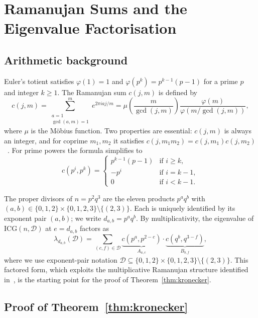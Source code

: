 \documentclass[12pt,a4paper]{article}
\theoremstyle{plain}
\theoremstyle{definition}
\newcommand{\ICG}{\mathrm{ICG}}
\newcommand{\vp}{\varphi}
\begin{document}
\section{Ramanujan Sums and the Eigenvalue Factorisation}
\label{sec:pattern}

\subsection{Arithmetic background}

Euler's totient satisfies $\vp(1)=1$ and $\vp(p^k)=p^{k-1}(p-1)$ for a
prime $p$ and integer $k\ge1$.  The Ramanujan sum $c(j,m)$ is defined by
\[
  c(j,m) = \sum_{\substack{a=1\\\gcd(a,m)=1}}^{m} e^{2\pi iaj/m}
  = \mu\!\left(\frac{m}{\gcd(j,m)}\right)
    \frac{\vp(m)}{\vp(m/\gcd(j,m))},
\]
where $\mu$ is the M\"{o}bius function.  Two properties are essential:
$c(j,m)$ is always an integer, and for coprime $m_1,m_2$ it satisfies
$c(j,m_1m_2)=c(j,m_1)c(j,m_2)$~\cite[Ch.~8]{ApostolNT}.  For prime
powers the formula simplifies to
\begin{equation}\label{eq:ram-prime-power}
  c(p^i,p^k) = \begin{cases}
    p^{k-1}(p-1) & \text{if } i \ge k, \\
    -p^{i}       & \text{if } i = k-1, \\
    0             & \text{if } i < k-1.
  \end{cases}
\end{equation}

The proper divisors of $n=p^2q^3$ are the eleven products $p^aq^b$ with
$(a,b)\in\{0,1,2\}\times\{0,1,2,3\}\setminus\{(2,3)\}$.  Each is
uniquely identified by its exponent pair $(a,b)$; we write $d_{a,b}=p^aq^b$.
By multiplicativity, the eigenvalue of $\ICG(n,\mathcal{D})$ at
$e=d_{a,b}$ factors as
\begin{equation}\label{eq:lambda-factor}
  \lambda_{d_{a,b}}(\mathcal{D}) = \sum_{(c,f)\in\mathcal{D}}
  \underbrace{c(p^a,p^{2-c})}_{A_{a,c}}\cdot
  \underbrace{c(q^b,q^{3-f})}_{B_{b,f}},
\end{equation}
where we use exponent-pair notation
$\mathcal{D}\subseteq\{0,1,2\}\times\{0,1,2,3\}\setminus\{(2,3)\}$.
This factored form, which exploits the multiplicative Ramanujan structure
identified in~\cite{LeSander2012laa,LeSander2012ijnt}, is the starting
point for the proof of Theorem~\ref{thm:kronecker}.

\subsection{Proof of Theorem~\ref{thm:kronecker}}
\end{document}
